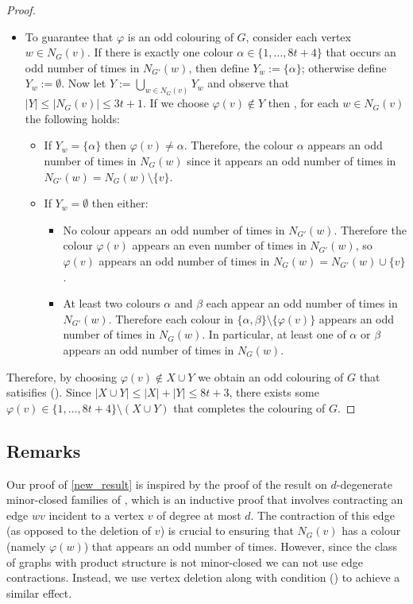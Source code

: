 \documentclass{patmorin}
\begin{document}
\begin{proof}
\begin{itemize}
    \item To guarantee that $\varphi$ is an odd colouring of $G$, consider each vertex $w\in N_{G}(v)$.  If there is exactly one colour $\alpha\in\{1,\ldots,8t+4\}$ that occurs an odd number of times in $N_{G'}(w)$, then define $Y_{w} := \{\alpha\}$; otherwise define $Y_{w}:=\emptyset$. Now let $Y:=\bigcup_{w\in N_{G}(v)} Y_{w}$ and observe that $|Y|\le |N_G(v)|\le 3t+1$.
    If we choose $\varphi(v)\not\in Y$ then , for each $w\in N_{G}(v)$ the following holds:
    \begin{itemize}
      \item If $Y_{w}=\{\alpha\}$ then $\varphi(v)\neq\alpha$. Therefore, the colour $\alpha$ appears an odd number of times in $N_{G}(w)$ since it appears an odd number of times in $N_{G'}(w)=N_G(w)\setminus\{v\}$.
      \item If $Y_{w}=\emptyset$ then either:
      \begin{itemize}
        \item No colour appears an odd number of times in $N_{G'}(w)$.  Therefore the colour $\varphi(v)$ appears an even number of times in $N_{G'}(w)$, so $\varphi(v)$ appears an odd number of times in $N_G(w)=N_{G'}(w)\cup\{v\}$.
        \item At least two colours $\alpha$ and $\beta$ each appear an odd number of times in $N_{G'}(w)$.  Therefore each colour in $\{\alpha,\beta\}\setminus\{\varphi(v)\}$ appears an odd number of times in $N_{G}(w)$.  In particular, at least one of $\alpha$ or $\beta$ appears an odd number of times in $N_G(w)$.
      \end{itemize}
    \end{itemize}
  \end{itemize}
  Therefore, by choosing $\varphi(v)\not\in X\cup Y$ we obtain an odd colouring of $G$ that satisifies ().  Since $|X\cup Y|\le |X|+|Y|\le 8t+3$, there exists some $\varphi(v)\in \{1,\ldots,8t+4\}\setminus(X\cup Y)$ that completes the colouring of $G$.
\end{proof}


\subsection{Remarks}

Our proof of \cref{new_result} is inspired by the proof of the result on $d$-degenerate minor-closed families of \citet{cranston.lafferty.ea:note}, which is an inductive proof that involves contracting an edge $wv$ incident to a vertex $v$ of degree at most $d$.  The contraction of this edge (as opposed to the deletion of $v$) is crucial to ensuring that $N_G(v)$ has a colour (namely $\varphi(w)$) that appears an odd number of times.  However, since the class of graphs with product structure is not minor-closed we can not use edge contractions. Instead, we use vertex deletion along with condition () to achieve a similar effect.
\end{document}
